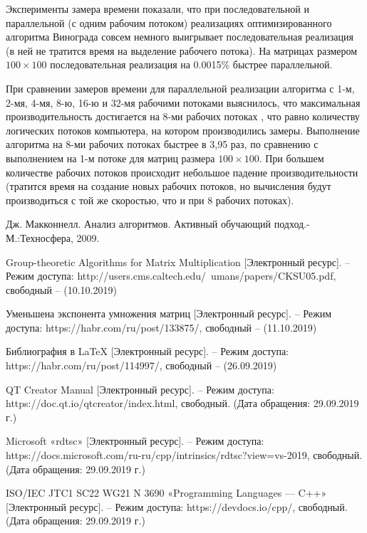 \documentclass[a4paper,12pt]{article}
\begin{document}
Эксперименты замера времени показали, что при последовательной и параллельной (с одним рабочим потоком) реализациях оптимизированного алгоритма Винограда совсем немного выигрывает последовательная реализация (в ней не тратится время на выделение рабочего потока). На матрицах размером $100 \times 100$ последовательная реализация на 0.0015\% быстрее параллельной.

При сравнении замеров времени для параллельной реализации алгоритма с 1-м, 2-мя, 4-мя, 8-ю, 16-ю и 32-мя рабочими потоками выяснилось, что максимальная производительность достигается на 8-ми рабочих потоках , что равно количеству логических потоков компьютера, на котором производились замеры. Выполнение алгоритма на 8-ми рабочих потоках быстрее в 3,95 раз, по сравнению с выполнением на 1-м потоке для матриц размера $100 \times 100$. При большем количестве рабочих потоков происходит небольшое падение производительности (тратится время на создание новых рабочих потоков, но вычисления будут производиться с той же скоростью, что и при 8 рабочих потоках).

\pagebreak

\begin{thebibliography}{}
	
	Дж. Макконнелл. Анализ алгоритмов. Активный 
	обучающий 
	подход.-М.:Техносфера, 2009.
	
	Group-theoretic Algorithms for Matrix Multiplication
	[Электронный ресурс]. – Режим доступа: http://users.cms.caltech.edu/~umans/papers/CKSU05.pdf, свободный – 
	(10.10.2019)
	
	Уменьшена экспонента умножения матриц
	[Электронный ресурс]. – Режим доступа: 
	https://habr.com/ru/post/133875/, свободный – 
	(11.10.2019)
	
	Библиография в LaTeX [Электронный ресурс]. – Режим 
	доступа: https://habr.com/ru/post/114997/, свободный 
	– (26.09.2019)
	
	 QT Creator Manual [Электронный ресурс]. – Режим
	доступа: https://doc.qt.io/qtcreator/index.html, свободный. (Дата
	обращения: 29.09.2019 г.)
	
	 Microsoft «rdtsc» [Электронный ресурс]. – Режим доступа:
	https://docs.microsoft.com/ru-ru/cpp/intrinsics/rdtsc?view=vs-2019,
	свободный. (Дата обращения: 29.09.2019 г.)
	
	 ISO/IEC JTC1 SC22 WG21 N 3690 «Programming Languages — C++» [Электронный ресурс]. – Режим доступа: https://devdocs.io/cpp/, свободный. (Дата обращения: 29.09.2019 г.)
	
\end{thebibliography}
\end{document}
